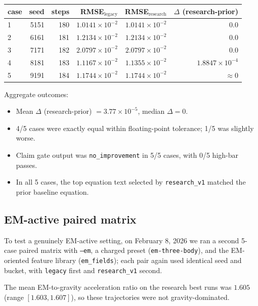 \documentclass[11pt]{article}
\begin{document}
\begin{center}
\begin{tabular}{lrrrrr}
\hline
case & seed & steps & RMSE$_\text{legacy}$ & RMSE$_\text{research}$ & $\Delta$ (research-prior) \\
\hline
1 & 5151 & 180 & $1.0141\times 10^{-2}$ & $1.0141\times 10^{-2}$ & $0.0$ \\
2 & 6161 & 181 & $1.2134\times 10^{-2}$ & $1.2134\times 10^{-2}$ & $0.0$ \\
3 & 7171 & 182 & $2.0797\times 10^{-2}$ & $2.0797\times 10^{-2}$ & $0.0$ \\
4 & 8181 & 183 & $1.1167\times 10^{-2}$ & $1.1355\times 10^{-2}$ & $1.8847\times 10^{-4}$ \\
5 & 9191 & 184 & $1.1744\times 10^{-2}$ & $1.1744\times 10^{-2}$ & $\approx 0$ \\
\hline
\end{tabular}
\end{center}

Aggregate outcomes:
\begin{itemize}
\item Mean $\Delta$ (research-prior) $=3.77\times 10^{-5}$, median $\Delta=0$.
\item 4/5 cases were exactly equal within floating-point tolerance; 1/5 was slightly worse.
\item Claim gate output was \texttt{no\_improvement} in 5/5 cases, with 0/5 high-bar passes.
\item In all 5 cases, the top equation text selected by \texttt{research\_v1} matched the prior baseline equation.
\end{itemize}

\subsection{EM-active paired matrix}
To test a genuinely EM-active setting, on February 8, 2026 we ran a second 5-case paired matrix with \texttt{--em}, a charged preset (\texttt{em-three-body}), and the EM-oriented feature library (\texttt{em\_fields}); each pair again used identical seed and bucket, with \texttt{legacy} first and \texttt{research\_v1} second.

The mean EM-to-gravity acceleration ratio on the research best runs was $1.605$ (range $[1.603,1.607]$), so these trajectories were not gravity-dominated.
\end{document}
